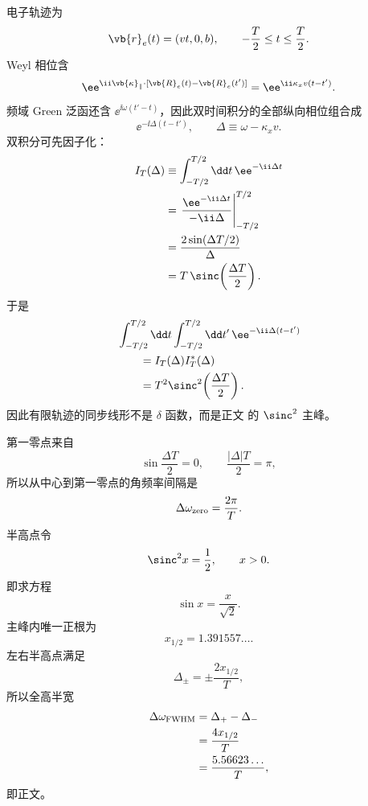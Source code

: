 \begin{derivation}[平面界面的混合表象与单位长度损失]
电子轨迹为
\begin{equation*}
 \vb{r}_e(t)=(vt,0,b),
 \qquad -\frac T2\le t\le\frac T2.
\end{equation*}
Weyl 相位含
\begin{equation*}
 \ee^{\ii\vb{\kappa}_\parallel\cdot
 [\vb{R}_e(t)-\vb{R}_e(t')]}
 =\ee^{\ii\kappa_xv(t-t')}.
\end{equation*}
频域 Green 泛函还含 $\ee^{\ii\omega(t'-t)}$，因此双时间积分的全部纵向相位组合成
\begin{equation*}
 \ee^{-\ii\Delta(t-t')},
 \qquad
 \Delta\equiv\omega-\kappa_xv.
\end{equation*}
双积分可先因子化：
\begin{align*}
 I_T(\Delta)
 &\equiv
 \int_{-T/2}^{T/2}\dd t\,
 \ee^{-\ii\Delta t}\\
 &=\left.
 \frac{\ee^{-\ii\Delta t}}{-\ii\Delta}
 \right|_{-T/2}^{T/2}\\
 &=\frac{2\sin(\Delta T/2)}{\Delta}\\
 &=T\,\sinc\!\left(\frac{\Delta T}{2}\right).
\end{align*}
于是
\begin{align*}
 &\int_{-T/2}^{T/2}\dd t
 \int_{-T/2}^{T/2}\dd t'\,
 \ee^{-\ii\Delta(t-t')}\\
 &\qquad=I_T(\Delta)I_T^*(\Delta)\\
 &\qquad=T^2\sinc^2\!\left(\frac{\Delta T}{2}\right).
\end{align*}
因此有限轨迹的同步线形不是 $\delta$ 函数，而是正文 的 $\sinc^2$ 主峰。

第一零点来自
\begin{equation*}
 \sin\frac{\Delta T}{2}=0,
 \qquad
 \frac{|\Delta|T}{2}=\pi,
\end{equation*}
所以从中心到第一零点的角频率间隔是
\begin{equation*}
 \Delta\omega_{\rm zero}=\frac{2\pi}{T}.
\end{equation*}
半高点令
\begin{equation*}
 \sinc^2x=\frac12,
 \qquad x>0.
\end{equation*}
即求方程
\begin{equation*}
 \sin x=\frac{x}{\sqrt2}.
\end{equation*}
主峰内唯一正根为
\begin{equation*}
 x_{1/2}=1.391557\ldots.
\end{equation*}
左右半高点满足
\begin{equation*}
 \Delta_\pm=\pm\frac{2x_{1/2}}{T},
\end{equation*}
所以全高半宽
\begin{align*}
 \Delta\omega_{\rm FWHM}
 &=\Delta_+-\Delta_-\\
 &=\frac{4x_{1/2}}{T}\\
 &=\frac{5.56623\ldots}{T},
\end{align*}
即正文。


\end{derivation}
